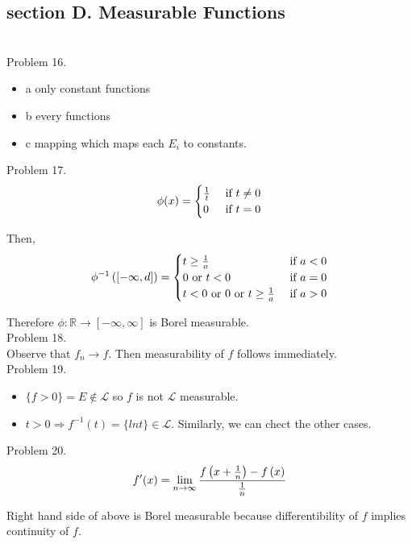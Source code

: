\subsection*{section D. Measurable Functions} \hfill \\

Problem 16. \\

\begin{itemize}
    \item {a} only constant functions
    \item {b} every functions
    \item {c} mapping which maps each $E_i$ to constants. \\
\end{itemize}

Problem 17. \\

\begin{equation*}
	\phi (x) =
	\begin{cases}
		{1 \over t } & \text{ if } t \ne 0 \\
		0 & \text{ if } t = 0
	\end{cases}
\end{equation*}

Then, 
\begin{equation*}
	\phi^{-1}\left ( \left [ -\infty, d \right ] \right ) = 
	\begin{cases}
		t \geq {1\over a} & \text{ if } a<0 \\
		0 \text{ or } t<0 & \text{ if } a = 0 \\
        t<0 \text{ or } 0 \text{ or } t \geq {1 \over a} & \text{ if } a > 0
    \end{cases}
\end{equation*}

Therefore $\phi : \mathbb{R} \rightarrow \left [ - \infty, \infty \right ]$ is Borel measurable. \\

Problem 18. \\

Observe that $f_n \rightarrow f$. Then measurability of $f$ follows immediately.\\

Problem 19. \\

\begin{itemize}
	\item $\{ f > 0 \}=E \notin \mathcal{L}$ so $f$ is not $\mathcal{L}$ measurable.
	\item $t>0 \Rightarrow f^{-1}(t) = \{lnt\} \in \mathcal{L}$. Similarly, we can chect the other cases.
\end{itemize}
Problem 20. \\

\begin{equation*}
	f'(x) = \lim_{n\rightarrow \infty} {f\left ( x + {1 \over n } \right ) - f \left ( x \right ) \over {1 \over n}}
\end{equation*}

Right hand side of above is Borel measurable because differentibility of $f$ implies continuity of $f$.\\

